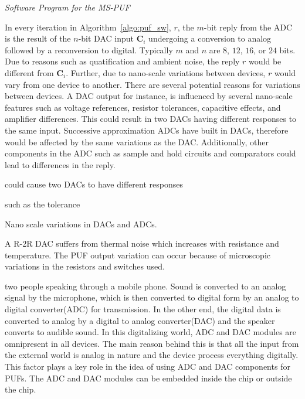 \begin{algorithm}[!ht] \label{algo:puf_sw}
\begin{scriptsize}
	\caption{\emph{Software Program for the MS-PUF}}
	\DontPrintSemicolon
\end{scriptsize}
\end{algorithm}

In every iteration in Algorithm~\ref{algo:puf_sw}, $r$, the $m$-bit reply from 
the ADC is the result of the $n$-bit DAC input $\mathbf C_i$
undergoing a conversion to analog followed by a reconversion to digital.
Typically $m$ and $n$ are $8$, $12$, $16$, or $24$ bits. 
Due to reasons such as quatification and ambient noise, the reply
$r$ would be different from $\mathbf C_i$. Further, due to nano-scale
variations between devices, $r$ would vary from one device
to another.  There are several potential reasons for variations 
between devices.
A DAC output for instance, is influenced by several nano-scale features such 
as voltage references, resistor tolerances, 
capacitive effects, and amplifier differences. This could result 
in two DACs having different responses to the same input. 
Successive approximation ADCs have built in DACs, therefore
would be affected by the same variations as the DAC. Additionally,
other components in the ADC such as sample and hold circuits and
comparators could lead to differences in the reply.








 could cause two DACs to have different responses


 such as the tolerance 


Nano scale variations in DACs and ADCs.





A R-2R DAC suffers from thermal noise which increases with resistance and temperature. The PUF output variation can occur because of microscopic variations in the resistors and switches used.


two people speaking through a mobile phone. Sound is converted to an analog signal by the microphone, which is
then converted to digital form by an analog to digital converter(ADC) for transmission. In the other end, the digital
data is converted to analog by a digital to analog converter(DAC) and the speaker converts to audible sound. In this
digitalizing world, ADC and DAC modules are omnipresent in all devices. The main reason behind this is that all the input from
the external world is analog in nature and the device process everything digitally. This factor plays a key role in
the idea of using ADC and DAC components for PUFs. The ADC and DAC modules can be embedded inside the chip or outside the chip.

